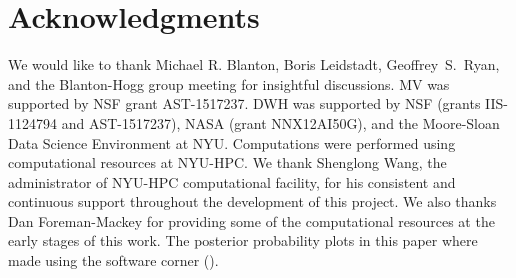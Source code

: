 \documentclass[12pt, preprint]{emulateapj}
\begin{document}
\section*{Acknowledgments}
We would like to thank Michael R. Blanton,  
Boris Leidstadt, Geoffrey~S.~Ryan, and the Blanton-Hogg group meeting for insightful discussions. MV was supported by NSF grant AST-1517237. DWH was supported 
by NSF (grants IIS-1124794 and AST-1517237), NASA (grant NNX12AI50G), and the Moore-Sloan 
Data Science Environment at NYU. Computations 
were performed using computational resources at NYU-HPC. We thank Shenglong Wang, the 
administrator of NYU-HPC computational facility, for his consistent and continuous support 
throughout the development of this project. We also thanks Dan Foreman-Mackey for providing some of the computational resources at the early stages of this work. The posterior probability plots in this paper where made using the software corner (\citealt{corner}).



\end{document}
